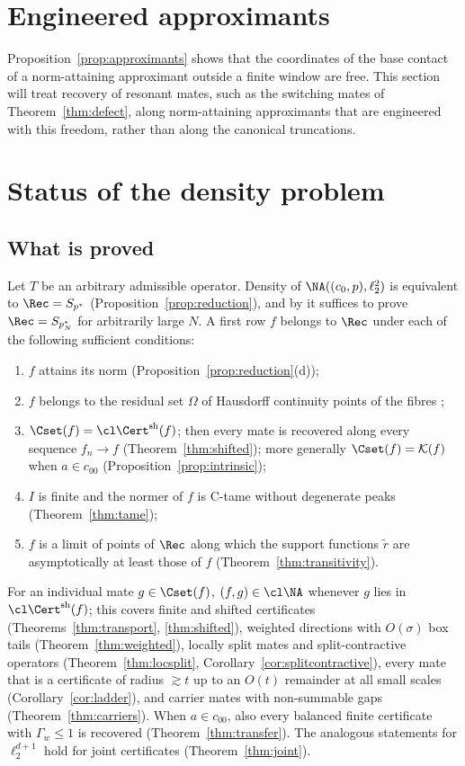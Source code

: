 \section{Engineered approximants}\label{sec:engineered}

Proposition~\ref{prop:approximants} shows that the coordinates of the base
contact of a norm-attaining approximant outside a finite window are free.
This section will treat recovery of resonant mates, such as the switching
mates of Theorem~\ref{thm:defect}, along norm-attaining approximants that are
engineered with this freedom, rather than along the canonical truncations.


\section{Status of the density problem}\label{sec:status}

\subsection{What is proved}
Let $T$ be an arbitrary admissible operator.  Density of
$\NA((c_0,p),\ell_2^2)$ is equivalent to $\Rec=S_{p^*}$
(Proposition~\ref{prop:reduction}), and by \cite[Remark martin-tail]{PrB} it
suffices to prove $\Rec=S_{p_N^*}$ for arbitrarily large $N$.  A first row
$f$ belongs to $\Rec$ under each of the following sufficient conditions:
\begin{enumerate}
\item[(S1)] $f$ attains its norm (Proposition~\ref{prop:reduction}(d));
\item[(S2)] $f$ belongs to the residual set $\Omega$ of Hausdorff continuity
points of the fibres \cite[Theorem~2.2]{PrA};
\item[(S3)] $\Cset(f)=\cl\Cert^{\rm sh}(f)$; then every mate is recovered
along every sequence $f_n\to f$ (Theorem~\ref{thm:shifted}); more generally
$\Cset(f)=\mathcal K(f)$ when $a\in c_{00}$ (Proposition~\ref{prop:intrinsic});
\item[(S4)] $I$ is finite and the normer of $f$ is C-tame without
degenerate peaks (Theorem~\ref{thm:tame});
\item[(S5)] $f$ is a limit of points of $\Rec$ along which the support
functions $\tilde r$ are asymptotically at least those of $f$
(Theorem~\ref{thm:transitivity}).
\end{enumerate}
For an individual mate $g\in\Cset(f)$, $(f,g)\in\cl\NA$ whenever $g$ lies
in $\cl\Cert^{\rm sh}(f)$; this covers finite and shifted certificates
(Theorems~\ref{thm:transport}, \ref{thm:shifted}), weighted directions with
$O(\sigma)$ box tails (Theorem~\ref{thm:weighted}), locally split mates and
split-contractive operators (Theorem~\ref{thm:locsplit},
Corollary~\ref{cor:splitcontractive}), every mate that is a certificate of
radius $\gtrsim t$ up to an $O(t)$ remainder at all small scales
(Corollary~\ref{cor:ladder}), and carrier mates with non-summable gaps
(Theorem~\ref{thm:carriers}).  When $a\in c_{00}$, also every balanced
finite certificate with $\Gamma_w\le1$ is recovered
(Theorem~\ref{thm:transfer}).  The analogous statements for
$\ell_2^{d+1}$ hold for joint certificates (Theorem~\ref{thm:joint}).

